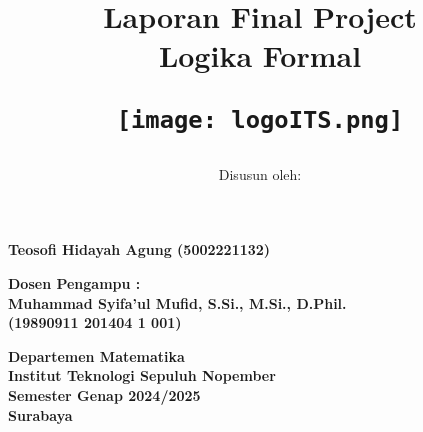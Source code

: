 \documentclass[11pt,a4paper
]{article}
\title{\textbf{Laporan Final Project \\
Logika Formal}\\
\begin{figure}[h!]
    \centering
    \texttt{[image: logoITS.png]}
\end{figure}
}
\author{Disusun oleh:}
\date{}
\begin{document}
\maketitle
\vspace{-1cm}
\begin{center}
  \textbf{Teosofi Hidayah Agung (5002221132)}
\end{center}

\vspace{0.5cm}
\begin{center}
  \textbf{Dosen Pengampu :\\
    Muhammad Syifa'ul Mufid, S.Si., M.Si., D.Phil.\\
    (19890911 201404 1 001)}
\end{center}

\vspace{0.5cm}
\begin{center}
  \textbf{Departemen Matematika\\
    Institut Teknologi Sepuluh Nopember\\
    Semester Genap 2024/2025\\
    Surabaya}
\end{center}

\newpage
\end{document}
